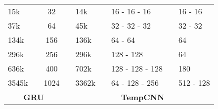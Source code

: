 \documentclass[runningheads]{llncs}
\begin{document}
\begin{table}[]
\begin{tabular}{lccclclcl}
15k   && 32   && 14k   && 16 -  16 -  16    && 16 -  16   \\
37k   && 64   && 45k   && 32 -  32 -  32    && 32 -  32   \\
134k  && 156  && 136k  && 64 -  64          && 64         \\
296k  && 256  && 296k  && 128 -  128        && 64         \\
636k  && 400  && 702k  && 128 -  128 -  128 && 180        \\
3545k && 1024 && 3362k && 64 -  128 -  256  && 512 -  128 \\ \cmidrule{1-3} \cmidrule{5-9} 
\multicolumn{3}{c}{\textbf{GRU}} & & \multicolumn{5}{c}{\textbf{TempCNN}}
\end{tabular}
\end{table} \FloatBarrier


\end{document}
